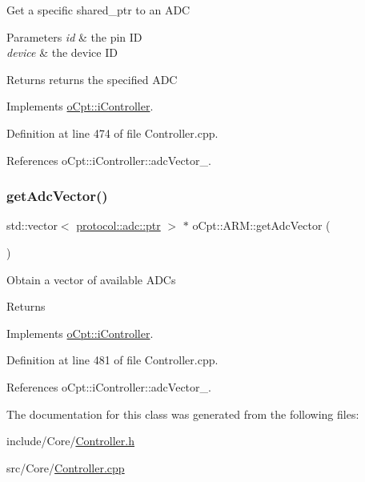 Get a specific shared\+\_\+ptr to an A\+DC 
\begin{DoxyParams}{Parameters}
{\em id} & the pin ID \\
\hline
{\em device} & the device ID \\
\hline
\end{DoxyParams}
\begin{DoxyReturn}{Returns}
returns the specified A\+DC 
\end{DoxyReturn}


Implements \hyperlink{classo_cpt_1_1i_controller_a7abf65f5912df117a3ff4c1c9643bba3}{o\+Cpt\+::i\+Controller}.



Definition at line 474 of file Controller.\+cpp.



References o\+Cpt\+::i\+Controller\+::adc\+Vector\+\_\+.

\hypertarget{classo_cpt_1_1_a_r_m_a32e77e29e34f3114f0b766b705366ba8}{}\label{classo_cpt_1_1_a_r_m_a32e77e29e34f3114f0b766b705366ba8} 
\subsubsection{\texorpdfstring{get\+Adc\+Vector()}{getAdcVector()}}
{\footnotesize\ttfamily std\+::vector$<$ \hyperlink{classo_cpt_1_1protocol_1_1adc_a94af68cb9c573629a4a1a16f8ebd3dff}{protocol\+::adc\+::ptr} $>$ $\ast$ o\+Cpt\+::\+A\+R\+M\+::get\+Adc\+Vector (\begin{DoxyParamCaption}{ }\end{DoxyParamCaption})\hspace{0.3cm}{\ttfamily [virtual]}}

Obtain a vector of available A\+D\+Cs \begin{DoxyReturn}{Returns}

\end{DoxyReturn}


Implements \hyperlink{classo_cpt_1_1i_controller_af414ebaf64b79ac45d1275e62799e36c}{o\+Cpt\+::i\+Controller}.



Definition at line 481 of file Controller.\+cpp.



References o\+Cpt\+::i\+Controller\+::adc\+Vector\+\_\+.



The documentation for this class was generated from the following files\+:\begin{DoxyCompactItemize}
\item 
include/\+Core/\hyperlink{_controller_8h}{Controller.\+h}\item 
src/\+Core/\hyperlink{_controller_8cpp}{Controller.\+cpp}\end{DoxyCompactItemize}
